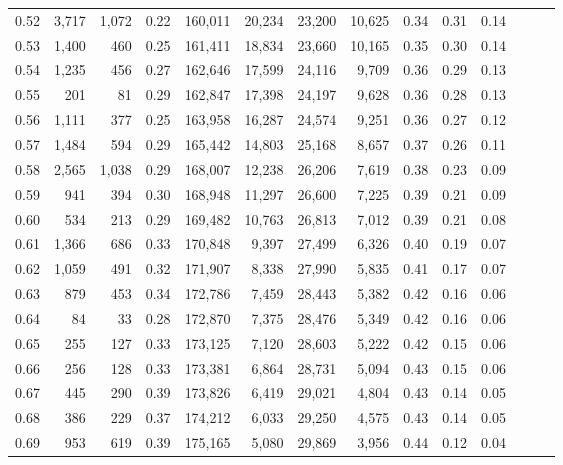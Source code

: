 \begin{tabular}{rrrrrrrrrrrrrr}
0.52 &   3,717 &  1,072 &  0.22 &  160,011 &   20,234 &  23,200 &  10,625 &  0.34 &  0.31 &      0.14 \\
0.53 &   1,400 &    460 &  0.25 &  161,411 &   18,834 &  23,660 &  10,165 &  0.35 &  0.30 &      0.14 \\
0.54 &   1,235 &    456 &  0.27 &  162,646 &   17,599 &  24,116 &   9,709 &  0.36 &  0.29 &      0.13 \\
0.55 &     201 &     81 &  0.29 &  162,847 &   17,398 &  24,197 &   9,628 &  0.36 &  0.28 &      0.13 \\
0.56 &   1,111 &    377 &  0.25 &  163,958 &   16,287 &  24,574 &   9,251 &  0.36 &  0.27 &      0.12 \\
0.57 &   1,484 &    594 &  0.29 &  165,442 &   14,803 &  25,168 &   8,657 &  0.37 &  0.26 &      0.11 \\
0.58 &   2,565 &  1,038 &  0.29 &  168,007 &   12,238 &  26,206 &   7,619 &  0.38 &  0.23 &      0.09 \\
0.59 &     941 &    394 &  0.30 &  168,948 &   11,297 &  26,600 &   7,225 &  0.39 &  0.21 &      0.09 \\
0.60 &     534 &    213 &  0.29 &  169,482 &   10,763 &  26,813 &   7,012 &  0.39 &  0.21 &      0.08 \\
0.61 &   1,366 &    686 &  0.33 &  170,848 &    9,397 &  27,499 &   6,326 &  0.40 &  0.19 &      0.07 \\
0.62 &   1,059 &    491 &  0.32 &  171,907 &    8,338 &  27,990 &   5,835 &  0.41 &  0.17 &      0.07 \\
0.63 &     879 &    453 &  0.34 &  172,786 &    7,459 &  28,443 &   5,382 &  0.42 &  0.16 &      0.06 \\
0.64 &      84 &     33 &  0.28 &  172,870 &    7,375 &  28,476 &   5,349 &  0.42 &  0.16 &      0.06 \\
0.65 &     255 &    127 &  0.33 &  173,125 &    7,120 &  28,603 &   5,222 &  0.42 &  0.15 &      0.06 \\
0.66 &     256 &    128 &  0.33 &  173,381 &    6,864 &  28,731 &   5,094 &  0.43 &  0.15 &      0.06 \\
0.67 &     445 &    290 &  0.39 &  173,826 &    6,419 &  29,021 &   4,804 &  0.43 &  0.14 &      0.05 \\
0.68 &     386 &    229 &  0.37 &  174,212 &    6,033 &  29,250 &   4,575 &  0.43 &  0.14 &      0.05 \\
0.69 &     953 &    619 &  0.39 &  175,165 &    5,080 &  29,869 &   3,956 &  0.44 &  0.12 &      0.04 \\

\end{tabular}
